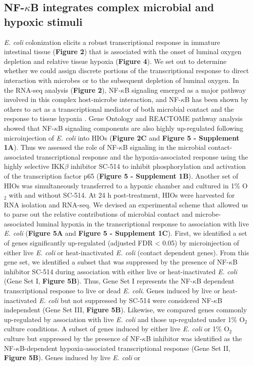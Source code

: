 \documentclass[9pt,lineo]{elife}
\begin{document}
\subsection*{{\bfseries\sffamily } NF-\(\kappa\)B integrates complex microbial and hypoxic stimuli}
\label{sec:orgheadline7}
\emph{E. coli} colonization elicits a robust transcriptional response in immature intestinal tissue (\textbf{Figure 2}) that is associated with the onset of luminal oxygen depletion and relative tissue hypoxia (\textbf{Figure 4}). We set out to determine whether we could assign discrete portions of the transcriptional response to direct interaction with microbes or to the subsequent depletion of luminal oxygen. In the RNA-seq analysis (\textbf{Figure 2}), NF-\(\kappa\)B signaling emerged as a major pathway involved in this complex host-microbe interaction, and NF-\(\kappa\)B has been shown by others to act as a transcriptional mediator of both microbial contact and the response to tissue hypoxia  \citep{Rius:2008,Gilmore:2006,Wullaert:2011}. Gene Ontology and REACTOME pathway analysis showed that NF-\(\kappa\)B signaling components are also highly up-regulated following microinjection of \emph{E. coli} into HIOs (\textbf{Figure 2C} and \textbf{Figure 5 - Supplement 1A}).  Thus we assessed the role of NF-\(\kappa\)B signaling in the microbial contact-associated transcriptional response and the hypoxia-associated response using the highly selective IKK\(\beta\) inhibitor SC-514 \citep{Kishore:2003,Litvak:2009} to inhibit phosphorylation and activation of the transcription factor p65 (\textbf{Figure 5 - Supplement 1B}). Another set of HIOs was simultaneously transferred to a hypoxic chamber and cultured in 1\% O\(_{\text{2}}\) with and without SC-514. At 24 h post-treatment, HIOs were harvested for RNA isolation and RNA-seq. We devised an experimental scheme that allowed us to parse out the relative contributions of microbial contact and microbe-associated luminal hypoxia in the transcriptional response to association with live \emph{E. coli} (\textbf{Figure 5A} and \textbf{Figure 5 - Supplement 1C}). First, we identified a set of genes significantly up-regulated (adjusted FDR < 0.05) by microinjection of either live \emph{E. coli} or heat-inactivated \emph{E. coli} (contact dependent genes). From this gene set, we identified a subset that was suppressed by the presence of NF-\(\kappa\)B inhibitor SC-514 during association with either live or heat-inactivated \emph{E. coli} (Gene Set I, \textbf{Figure 5B}). Thus, Gene Set I represents the NF-\(\kappa\)B dependent transcriptional response to live or dead \emph{E. coli}. Genes induced by live or heat-inactivated \emph{E. coli} but not suppressed by SC-514 were considered NF-\(\kappa\)B independent (Gene Set III, \textbf{Figure 5B}). Likewise, we compared genes commonly up-regulated by association with live \emph{E. coli} and those up-regulated under 1\% O\(_{\text{2}}\) culture conditions. A subset of genes induced by either live \emph{E. coli} or 1\% O\(_{\text{2}}\) culture but suppressed by the presence of NF-\(\kappa\)B inhibitor was identified as the NF-\(\kappa\)B-dependent hypoxia-associated transcriptional response (Gene Set II, \textbf{Figure 5B}). Genes induced by live \emph{E. coli} or 
\end{document}

